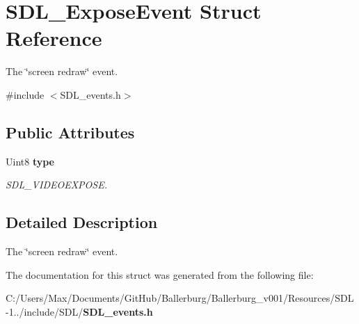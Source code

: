 \section{S\+D\+L\+\_\+\+Expose\+Event Struct Reference}
\label{struct_s_d_l___expose_event}


The \char`\"{}screen redraw\char`\"{} event.  




{\ttfamily \#include $<$S\+D\+L\+\_\+events.\+h$>$}

\subsection*{Public Attributes}
\begin{DoxyCompactItemize}
\item 
Uint8 {\bf type}\label{struct_s_d_l___expose_event_a3d6e2c14e4492130733e055b6db0c8c8}

\begin{DoxyCompactList}\small\item\em S\+D\+L\+\_\+\+V\+I\+D\+E\+O\+E\+X\+P\+O\+S\+E. \end{DoxyCompactList}\end{DoxyCompactItemize}


\subsection{Detailed Description}
The \char`\"{}screen redraw\char`\"{} event. 

The documentation for this struct was generated from the following file\+:\begin{DoxyCompactItemize}
\item 
C\+:/\+Users/\+Max/\+Documents/\+Git\+Hub/\+Ballerburg/\+Ballerburg\+\_\+v001/\+Resources/\+S\+D\+L-\/1../include/\+S\+D\+L/{\bf S\+D\+L\+\_\+events.\+h}\end{DoxyCompactItemize}
